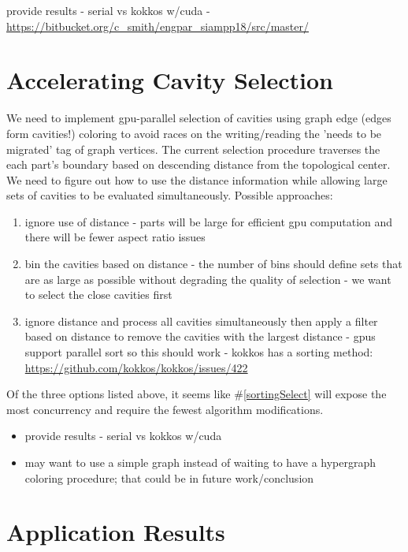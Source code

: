\documentclass[graybox]{svmult}
\begin{document}
provide results - serial vs kokkos w/cuda -
\url{https://bitbucket.org/c_smith/engpar_siampp18/src/master/}

\section{Accelerating Cavity Selection} \label{sec:select}

We need to implement gpu-parallel selection of cavities using graph edge (edges
form cavities!) coloring to avoid races on the writing/reading the 'needs to be
migrated' tag of graph vertices.
The current selection procedure traverses the each part's boundary based on
descending distance from the topological center.
We need to figure out how to use the distance information while allowing large
sets of cavities to be evaluated simultaneously.
Possible approaches:
\begin{enumerate}
  \item ignore use of distance - parts will be large for efficient gpu
    computation and there will be fewer aspect ratio issues
  \item bin the cavities based on distance - the number of bins should define
    sets that are as large as possible without degrading the quality of
    selection - we want to select the close cavities first
  \item ignore distance and process all cavities simultaneously then apply a
    filter based on distance to remove the cavities with the largest distance -
    gpus support parallel sort so this should work - kokkos has a sorting
    method:
    \url{https://github.com/kokkos/kokkos/issues/422} \label{sortingSelect}
\end{enumerate}

Of the three options listed above, it seems like \#\ref{sortingSelect} will
expose the most concurrency and require the fewest algorithm modifications.

\begin{itemize}
  \item provide results - serial vs kokkos w/cuda
  \item may want to use a simple graph instead of waiting to have a hypergraph coloring procedure; that could be in future work/conclusion
\end{itemize}

\section{Application Results} \label{sec:results}
\end{document}
